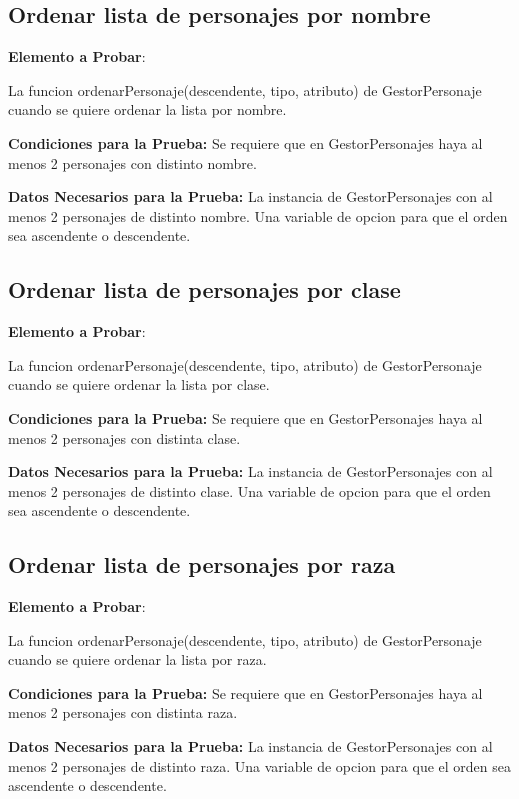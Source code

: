 \documentclass{article}
\begin{document}
\subsection{Ordenar lista de personajes por nombre}

   \textbf{ Elemento a Probar}: 
   
   La funcion ordenarPersonaje(descendente, tipo, atributo) de GestorPersonaje cuando se quiere ordenar la lista por nombre.
   
    \textbf{Condiciones para la Prueba:}
        Se requiere que en GestorPersonajes haya al menos 2 personajes con distinto nombre.

    \textbf{Datos Necesarios para la Prueba:}
        La instancia de GestorPersonajes con al menos 2 personajes de distinto nombre.
        Una variable de opcion para que el orden sea ascendente o descendente.

\subsection{Ordenar lista de personajes por clase}

    \textbf{ Elemento a Probar}: 
    
    La funcion ordenarPersonaje(descendente, tipo, atributo) de GestorPersonaje cuando se quiere ordenar la lista por clase.
    
        \textbf{Condiciones para la Prueba:}
            Se requiere que en GestorPersonajes haya al menos 2 personajes con distinta clase.   
    
        \textbf{Datos Necesarios para la Prueba:}
            La instancia de GestorPersonajes con al menos 2 personajes de distinto clase.
            Una variable de opcion para que el orden sea ascendente o descendente.

\subsection{Ordenar lista de personajes por raza}

    \textbf{ Elemento a Probar}: 
    
    La funcion ordenarPersonaje(descendente, tipo, atributo) de GestorPersonaje cuando se quiere ordenar la lista por raza.
    
        \textbf{Condiciones para la Prueba:}
            Se requiere que en GestorPersonajes haya al menos 2 personajes con distinta raza.    
    
        \textbf{Datos Necesarios para la Prueba:}
            La instancia de GestorPersonajes con al menos 2 personajes de distinto raza.
            Una variable de opcion para que el orden sea ascendente o descendente.
\end{document}
